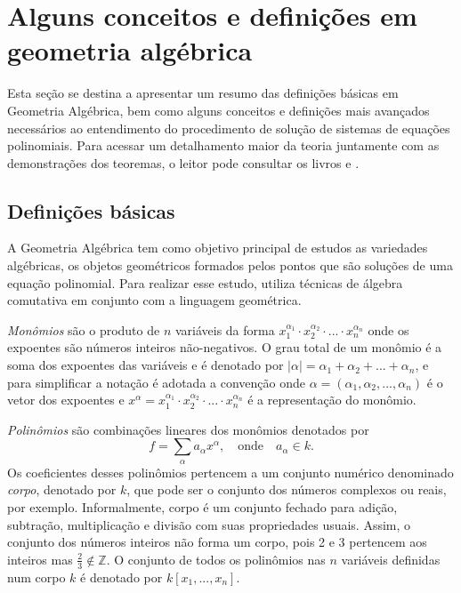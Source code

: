 \section{Alguns conceitos e definições em geometria algébrica}\label{sec.geo-algebrica}

Esta seção se destina a apresentar um resumo das definições básicas em Geometria Algébrica, bem como alguns conceitos e definições mais avançados necessários ao entendimento do procedimento de solução de sistemas de equações polinomiais. Para acessar um detalhamento maior da teoria juntamente com as demonstrações dos teoremas, o leitor pode consultar os livros \citep{cox-using} e \citep{cox-ideals}.

\subsection*{Definições básicas}

A Geometria Algébrica tem como objetivo principal de estudos as variedades algébricas, os objetos geométricos
formados pelos pontos que são soluções de uma equação polinomial. Para realizar esse
estudo, utiliza técnicas de álgebra comutativa em conjunto com a linguagem geométrica.

{\it Monômios} são o produto de $n$ variáveis da forma $x_1^{\alpha_1}\cdot x_2^{\alpha_2} \cdot ... \cdot x_n^{\alpha_n}$ onde os expoentes são números inteiros não-negativos. O grau total de um monômio é a soma dos expoentes das variáveis e é denotado por $|\alpha|=\alpha_1+\alpha_2+...+\alpha_n$, e para simplificar a notação é adotada a convenção onde $\alpha=(\alpha_1,\alpha_2,...,\alpha_n)$ é o vetor dos expoentes e $x^\alpha=x_1^{\alpha_1}\cdot x_2^{\alpha_2} \cdot ... \cdot x_n^{\alpha_n}$ é a representação do monômio.

{\it Polinômios} são combinações lineares dos monômios denotados por
\begin{equation*}
f=\sum_\alpha a_\alpha x^\alpha,\quad\text{onde}\quad a_\alpha\in k.
\end{equation*} 
Os coeficientes desses polinômios pertencem a um conjunto numérico denominado {\it corpo}, denotado por $k$, que pode ser o conjunto dos números complexos ou reais, por exemplo. Informalmente, corpo é um conjunto fechado para adição, subtração, multiplicação e divisão com suas propriedades usuais. Assim, o conjunto dos números inteiros não forma um corpo, pois 2 e 3 pertencem aos inteiros mas $\frac{2}{3}\notin\mathbb{Z}$. O conjunto de todos os polinômios nas $n$ variáveis definidas num corpo $k$ é denotado por $k[x_1,...,x_n]$.

